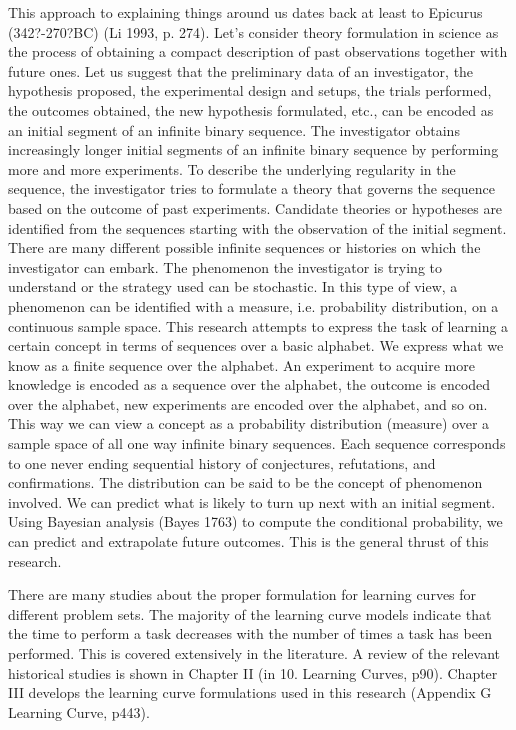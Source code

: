 This approach to explaining things around us dates back at least to Epicurus
(342?-270?BC) (Li 1993, p. 274). Let’s consider theory formulation in science as the
process of obtaining a compact description of past observations together with future ones.
Let us suggest that the preliminary data of an investigator, the hypothesis proposed, the
experimental design and setups, the trials performed, the outcomes obtained, the new
hypothesis formulated, etc., can be encoded as an initial segment of an infinite binary
sequence. The investigator obtains increasingly longer initial segments of an infinite
binary sequence by performing more and more experiments. To describe the underlying
regularity in the sequence, the investigator tries to formulate a theory that governs the
sequence based on the outcome of past experiments. Candidate theories or hypotheses
are identified from the sequences starting with the observation of the initial segment.
There are many different possible infinite sequences or histories on which the
investigator can embark. The phenomenon the investigator is trying to understand or the
strategy used can be stochastic. In this type of view, a phenomenon can be identified
with a measure, i.e. probability distribution, on a continuous sample space.
This research attempts to express the task of learning a certain concept in terms of
sequences over a basic alphabet. We express what we know as a finite sequence over the
alphabet. An experiment to acquire more knowledge is encoded as a sequence over the
alphabet, the outcome is encoded over the alphabet, new experiments are encoded over
the alphabet, and so on. This way we can view a concept as a probability distribution
(measure) over a sample space of all one way infinite binary sequences. Each sequence
corresponds to one never ending sequential history of conjectures, refutations, and
confirmations. The distribution can be said to be the concept of phenomenon involved.
We can predict what is likely to turn up next with an initial segment. Using Bayesian
analysis (Bayes 1763) to compute the conditional probability, we can predict and
extrapolate future outcomes. This is the general thrust of this research.

There are many studies about the proper formulation for learning curves for
different problem sets. The majority of the learning curve models indicate that the time
to perform a task decreases with the number of times a task has been performed. This is
covered extensively in the literature. A review of the relevant historical studies is shown
in Chapter II (in 10. Learning Curves, p90). Chapter III develops the learning curve
formulations used in this research (Appendix G Learning Curve, p443).